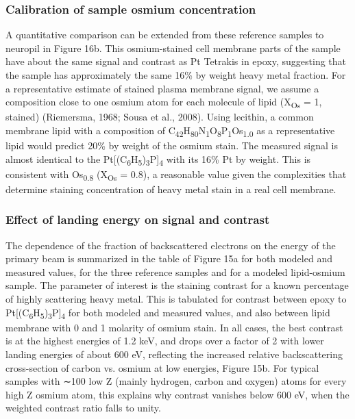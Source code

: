 \documentclass{article}
\begin{document}
\subsubsection*{Calibration of sample osmium concentration}

A quantitative comparison can be extended from these reference samples to neuropil in Figure 16b. This osmium-stained cell membrane parts of the sample have about the same signal and contrast as Pt Tetrakis in epoxy, suggesting that the sample has approximately the same 16\% by weight heavy metal fraction. For a representative estimate of stained plasma membrane signal, we assume a composition close to one osmium atom for each molecule of lipid (X\textsubscript{Os} = 1, stained) (Riemersma, 1968; Sousa et al., 2008). Using lecithin, a common membrane lipid with a composition of C\textsubscript{42}H\textsubscript{80}N\textsubscript{1}O\textsubscript{8}P\textsubscript{1}Os\textsubscript{1.0} as a representative lipid would predict 20\% by weight of the osmium stain. The measured signal is almost identical to the Pt[(C\textsubscript{6}H\textsubscript{5})\textsubscript{3}P]\textsubscript{4} with its 16\% Pt by weight. This is consistent with Os\textsubscript{0.8} (X\textsubscript{Os} = 0.8), a reasonable value given the complexities that determine staining concentration of heavy metal stain in a real cell membrane.

\subsubsection*{Effect of landing energy on signal and contrast}

The dependence of the fraction of backscattered electrons on the energy of the primary beam is summarized in the table of Figure 15a for both modeled and measured values, for the three reference samples and for a modeled lipid-osmium sample. The parameter of interest is the staining contrast for a known percentage of highly scattering heavy metal. This is tabulated for contrast between epoxy to Pt[(C\textsubscript{6}H\textsubscript{5})\textsubscript{3}P]\textsubscript{4} for both modeled and measured values, and also between lipid membrane with 0 and 1 molarity of osmium stain. In all cases, the best contrast is at the highest energies of 1.2 keV, and drops over a factor of 2 with lower landing energies of about 600 eV, reflecting the increased relative backscattering cross-section of carbon vs. osmium at low energies, Figure 15b. For typical samples with ∼100 low Z (mainly hydrogen, carbon and oxygen) atoms for every high Z osmium atom, this explains why contrast vanishes below 600 eV, when the weighted contrast ratio falls to unity.
\end{document}
